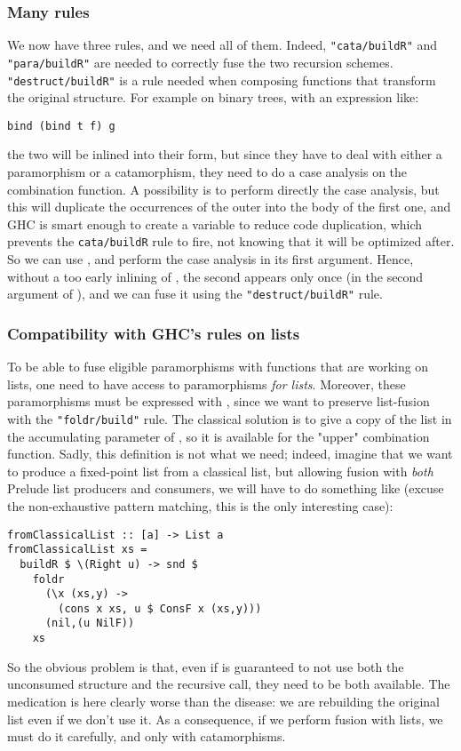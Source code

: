\subsubsection{Many rules}
We now have three rules, and we need all of them. Indeed, \verb|"cata/buildR"| and \verb|"para/buildR"| are needed to correctly fuse the two recursion schemes. \verb|"destruct/buildR"| is a rule needed when composing functions that transform the original structure. For example on binary trees, with an expression like:
\begin{verbatim}
bind (bind t f) g
\end{verbatim}
\noindent the two  will be inlined into their  form, but since they have to deal with either a paramorphism or a catamorphism, they need to do a case analysis on the combination function. A possibility is to perform directly the case analysis, but this will duplicate the occurrences of the outer  into the body of the first one, and GHC is smart enough to create a variable to reduce code duplication, which prevents the \verb|cata/buildR| rule to fire, not knowing that it will be optimized after. So we can use , and perform the case analysis in its first argument. Hence, without a too early inlining of , the second  appears only once (in the second argument of ), and we can fuse it using the \verb|"destruct/buildR"| rule.

\subsubsection{Compatibility with GHC's rules on lists}
\label{sec:parabuild}
To be able to fuse eligible paramorphisms with functions that are working on lists, one need to have access to paramorphisms \emph{for lists}. Moreover, these paramorphisms must be expressed with , since we want to preserve list-fusion with the \verb|"foldr/build"| rule. The classical solution is to give a copy of the list in the accumulating parameter of , so it is available for the "upper" combination function. Sadly, this definition is not what we need; indeed, imagine that we want to produce a fixed-point list from a classical list, but allowing fusion with \emph{both} Prelude list producers and  consumers, we will have to do something like (excuse the non-exhaustive pattern matching, this is the only interesting case):
\begin{verbatim}
fromClassicalList :: [a] -> List a
fromClassicalList xs =
  buildR $ \(Right u) -> snd $
    foldr
      (\x (xs,y) ->
        (cons x xs, u $ ConsF x (xs,y)))
      (nil,(u NilF))
    xs
\end{verbatim}
\noindent So the obvious problem is that, even if  is guaranteed to not use both the unconsumed structure and the recursive call, they need to be both available. The medication is here clearly worse than the disease: we are rebuilding the original list even if we don't use it. As a consequence, if we perform fusion with lists, we must do it carefully, and only with catamorphisms.

